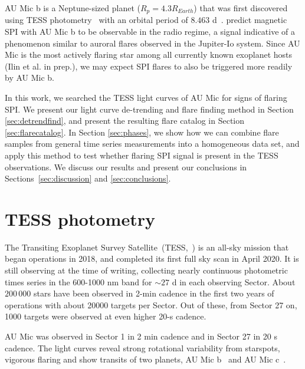\documentclass[fleqn,usenatbib,letters]{mnras}%
\begin{document}
AU Mic b is a Neptune-sized planet ($R_p = 4.3R_{Earth}$) that was first discovered using TESS photometry~\citep{plavchan2020} with an orbital period of $8.463$ d~\citep{plavchan2020,martioli2021new}. %
\citet{kavanagh2021} predict magnetic SPI with AU Mic b to be observable in the radio regime, a signal indicative of a phenomenon similar to auroral flares observed in the Jupiter-Io system. Since AU Mic is the most actively flaring star among all currently known exoplanet hosts (Ilin et al. in prep.), we may expect SPI flares to also be triggered more readily by AU Mic b. 

In this work, we searched the TESS light curves of AU Mic for signs of flaring SPI. We present our light curve de-trending and flare finding method in Section \ref{sec:detrendfind}, and present the resulting flare catalog in Section \ref{sec:flarecatalog}. In Section \ref{sec:phases}, we show how we can combine flare samples from general time series measurements into a homogeneous data set, and apply this method to test whether flaring SPI signal is present in the TESS observations. We discuss our results and present our conclusions in Sections~\ref{sec:discussion} and \ref{sec:conclusions}.


\section{TESS photometry}
The Transiting Exoplanet Survey Satellite~(TESS,~\citealt{ricker2014}) is an all-sky mission that began operations in 2018, and completed its first full sky scan in April 2020. It is still observing at the time of writing, collecting nearly continuous photometric times series in the 600-1000 nm band for $\sim 27$ d in each observing Sector. About $200\,000$ stars have been observed in 2-min cadence in the first two years of operations with about 20000 targets per Sector. Out of these, from Sector 27 on, 1000 targets were observed at even higher 20-s cadence.

AU Mic was observed in Sector 1 in 2 min cadence and in Sector 27 in 20 s cadence. The light curves reveal strong rotational variability from starspots, vigorous flaring and show transits of two planets, AU Mic b~\citep{plavchan2020,martioli2021new} and AU Mic c~\citep{martioli2021new}.
\end{document}
